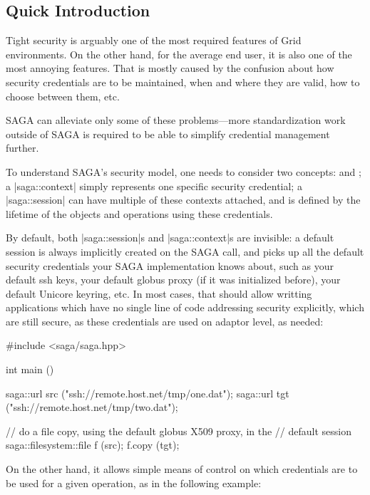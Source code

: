 
 \subsection{Quick Introduction}

  Tight security is arguably one of the most required features of Grid
  environments.  On the other hand, for the average end user, it is also one of the most
  annoying features.  That is mostly caused
  by the confusion about how security credentials are to be
  maintained, when and where they are valid, how to choose between
  them, etc.

  SAGA can alleviate only some of these problems---more standardization work outside of SAGA is required to be able to
  simplify credential management further.

  To understand SAGA's security model, one needs to consider two
  concepts:  and ;  a |saga::context| simply
  represents one specific security credential; a |saga::session| can
  have multiple of these contexts attached, and is defined by the
  lifetime of the objects and operations using these credentials.

  By default, both |saga::session|s and |saga::context|s are
  invisible: a default session is always implicitly created on the
  SAGA call, and picks up all the default security credentials your
  SAGA implementation knows about, such as your default ssh keys, your
  default globus proxy (if it was initialized before), your default
  Unicore keyring, etc.  In most cases, that should allow writting
  applications which have no single line of code
  addressing security explicitly, which are still secure, as these
  credentials are used on adaptor level, as needed:

  \begin{mycode}[label=Secure gsiftp file copy]
  #include <saga/saga.hpp>

  int main ()
  {
    saga::url src ("ssh://remote.host.net/tmp/one.dat");
    saga::url tgt ("ssh://remote.host.net/tmp/two.dat");

    // do a file copy, using the default globus X509 proxy, in the
    // default session
    saga::filesystem::file f (src);
    f.copy (tgt);
  }
  \end{mycode}

  On the other hand, it allows simple means of control on which
  credentials are to be used for a given operation, as in the following
  example:
 
